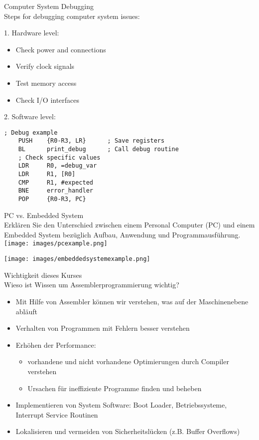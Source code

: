 \begin{KR}{Computer System Debugging}\\
Steps for debugging computer system issues:

1. Hardware level:
\begin{itemize}
  \item Check power and connections
  \item Verify clock signals
  \item Test memory access
  \item Check I/O interfaces
\end{itemize}

2. Software level:
\begin{lstlisting}[language=armasm, style=basesmol]
    ; Debug example
    PUSH    {R0-R3, LR}      ; Save registers
    BL      print_debug      ; Call debug routine
    ; Check specific values
    LDR     R0, =debug_var
    LDR     R1, [R0]
    CMP     R1, #expected
    BNE     error_handler
    POP     {R0-R3, PC}
\end{lstlisting}
\end{KR}

\begin{example2}{PC vs. Embedded System}\\
Erklären Sie den Unterschied zwischen einem Personal Computer (PC) und einem Embedded System bezüglich Aufbau, Anwendung und Programmausführung.\\
\texttt{[image: images/pcexample.png]}

\texttt{[image: images/embeddedsystemexample.png]}
\end{example2}



\begin{example2}{Wichtigkeit dieses Kurses}\\
Wieso ist Wissen um Assemblerprogrammierung wichtig?
\begin{itemize}
  \item Mit Hilfe von Assembler können wir verstehen, was auf der Maschinenebene abläuft 
  \item Verhalten von Programmen mit Fehlern besser verstehen
  \item Erhöhen der Performance:
  \begin{itemize}
    \item vorhandene und nicht vorhandene Optimierungen durch Compiler verstehen
    \item Ursachen für ineffiziente Programme finden und beheben
  \end{itemize}
  \item Implementieren von System Software: Boot Loader, Betriebssysteme, Interrupt Service Routinen 
  \item Lokalisieren und vermeiden von Sicherheitslücken (z.B. Buffer Overflows)
\end{itemize}
\end{example2}